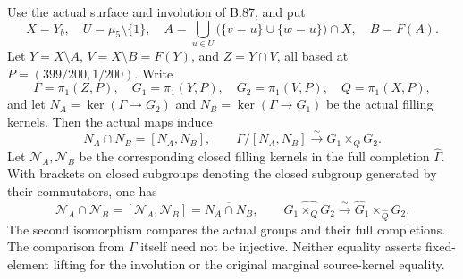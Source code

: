 \label{stmt:B89}
Use the actual surface and involution of B.87, and put
\[
 X=Y_b,\quad U=\mu _5\setminus\{1\},\quad
 A=\bigcup_{u\in U}\bigl(\{v=u\}\cup\{w=u\}\bigr)\cap X,
 \quad B=F(A).
\]
Let $Y=X\setminus A$, $V=X\setminus B=F(Y)$, and
$Z=Y\cap V$, all based at $P=(399/200,1/200)$. Write
\[
 \Gamma=\pi _1(Z,P),\quad G_1=\pi _1(Y,P),\quad
 G_2=\pi _1(V,P),\quad Q=\pi _1(X,P),
\]
and let $N_A=\ker(\Gamma\to G_2)$ and
$N_B=\ker(\Gamma\to G_1)$ be the actual filling kernels.
Then the actual maps induce
\begin{equation}\label{eq:B89-discrete}
 N_A\cap N_B=[N_A,N_B],\qquad
 \Gamma/[N_A,N_B]\xrightarrow{\sim}G_1\times_QG_2.
\end{equation}
Let $\mathcal N_A,\mathcal N_B$ be the corresponding closed filling
kernels in the full completion $\widehat\Gamma$. With brackets on
closed subgroups denoting the closed subgroup generated by their
commutators, one has
\begin{equation}\label{eq:B89-compact}
 \mathcal N_A\cap\mathcal N_B
   =[\mathcal N_A,\mathcal N_B]
   =\overline{N_A\cap N_B},
 \qquad
 \widehat{G_1\times_QG_2}
   \xrightarrow{\sim}\widehat G_1\times_{\widehat Q}\widehat G_2.
\end{equation}
The second isomorphism compares the actual groups and their full
completions. The comparison from $\Gamma$ itself need not be injective.
Neither equality asserts fixed-element lifting for the involution or
the original marginal source-kernel equality.

